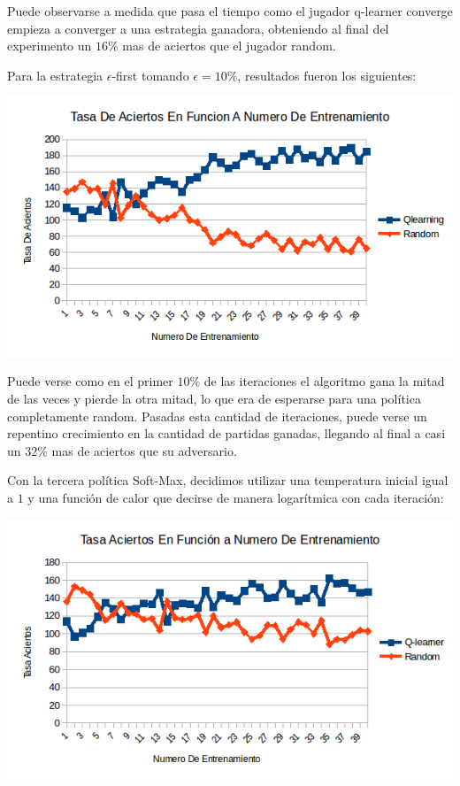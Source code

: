 Puede observarse a medida que pasa el tiempo como el jugador q-learner converge empieza a converger a una estrategia ganadora, obteniendo al final del experimento un $16\%$ mas de aciertos que el jugador random.

Para la estrategia $\epsilon$-first tomando $\epsilon=10\%$, resultados fueron los siguientes:

\includegraphics[scale=0.5]{testing/ef.png}

Puede verse como en el primer $10\%$ de las iteraciones el algoritmo gana la mitad de las veces y pierde la otra mitad, lo que era de esperarse para una política completamente random. Pasadas esta cantidad de iteraciones, puede verse un repentino crecimiento en la cantidad de partidas ganadas, llegando al final a casi un $32\%$ mas de aciertos que su adversario.

Con la tercera política Soft-Max, decidimos utilizar una temperatura inicial igual a $1$ y una función de calor que decirse de manera logarítmica con cada iteración:

\includegraphics[scale=0.5]{testing/softmax.png}

